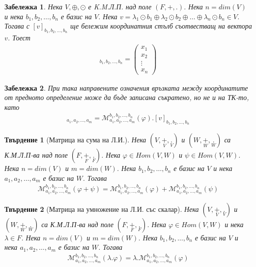 \documentclass[12pt]{article}
\newtheorem{remark}{{Забележка}}%
\newtheorem{proposition}{Твърдение}%
\begin{document}
\begin{remark}
Нека \(V, \oplus, \odot\) е K.M.Л.П. над поле \((F, +, .)\).
Нека \(n = dim(V)\) и нека \(b_1, b_2, \dots, b_n\) е базис на \(V\).
Нека \(v = \lambda_1 \odot b_1 \oplus \lambda_2 \odot b_2 \oplus \dots \oplus \lambda_n \odot b_n \in V\).
Тогава с \([v]_{b_1, b_2, \dots, b_n}\) ще бележим координатния стълб съотвестващ на вектора \(v\).
Тоест
\begin{align*}
[v]_{b_1, b_2, \dots, b_n}
=
\begin{pmatrix}
x_1 \\
x_2 \\
\vdots \\
x_n
\end{pmatrix}
\end{align*}
\end{remark}

\begin{remark}
При така направените означения връзката между координатите от предното определение може да бъде записана
съкратено, но не и на ТК-то, като
\begin{align*}
[\varphi(v)]_{a_1, a_2, \dots, a_m}
=
\mathcal{M}_{a_1, a_2, \dots, a_m}^{b_1, b_2, \dots, b_n}(\varphi)
.
[v]_{b_1, b_2, \dots, b_n}
\end{align*}
\end{remark}

\begin{proposition}[Матрица на сума на Л.И.]
Нека \((V, \underset{V}{+}, \underset{V}{.})\) и \((W, \underset{W}{+}, \underset{W}{.})\) са К.М.Л.П-ва над поле \((F, \underset{F}{+}, \underset{F}{.})\).
Нека \(\varphi \in Hom(V, W)\) и \(\psi \in Hom(V, W)\).
Нека \(n = dim(V)\) и \(m = dim(W)\).
Нека \(b_1, b_2, \dots, b_n\) е базис на \(V\)
и нека \(a_1, a_2, \dots, a_m\) е базис на \(W\).
Тогава
\begin{align*}
\mathcal{M}_{a_1, a_2, \dots, a_m}^{b_1, b_2, \dots, b_n}(\varphi + \psi)
=
\mathcal{M}_{a_1, a_2, \dots, a_m}^{b_1, b_2, \dots, b_n}(\varphi)
+
\mathcal{M}_{a_1, a_2, \dots, a_m}^{b_1, b_2, \dots, b_n}(\psi)
\end{align*}
\end{proposition}

\begin{proposition}[Матрица на умножение на Л.И. със скалар]
Нека \((V, \underset{V}{+}, \underset{V}{.})\) и \((W, \underset{W}{+}, \underset{W}{.})\) са К.М.Л.П-ва над поле \((F, \underset{F}{+}, \underset{F}{.})\).
Нека \(\varphi \in Hom(V, W)\) и нека \(\lambda \in F\).
Нека \(n = dim(V)\) и \(m = dim(W)\).
Нека \(b_1, b_2, \dots, b_n\) е базис на \(V\)
и нека \(a_1, a_2, \dots, a_m\) е базис на \(W\).
Тогава
\begin{align*}
\mathcal{M}_{a_1, a_2, \dots, a_m}^{b_1, b_2, \dots, b_n}(\lambda . \varphi)
=
\lambda
.
\mathcal{M}_{a_1, a_2, \dots, a_m}^{b_1, b_2, \dots, b_n}(\varphi)
\end{align*}
\end{proposition}
\end{document}

